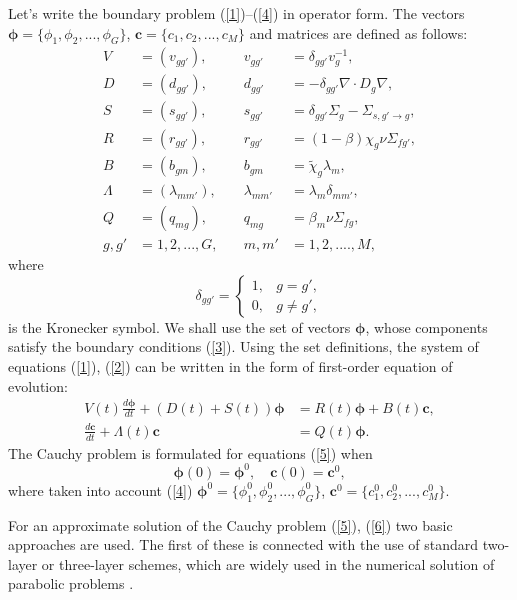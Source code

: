 \documentclass[authoryear]{elsarticle}
\begin{document}
Let's write the boundary problem (\ref{1})--(\ref{4}) in operator form. The vectors 
 $\bm \phi = \{\phi_1, \phi_2, ..., \phi_G\}$, $\bm c = \{c_1, c_2, ..., c_M\}$ 
and matrices are defined as follows:
\[
\begin{aligned}
 V & = (v_{g g'}), &
  \quad v_{g g'} & = \delta_{g g'} v_g^{-1}, \\
 D & = (d_{g g'}), &
 \quad d_{g g'} & = - \delta_{g g'} \nabla \cdot D_g \nabla, \\
 S & = (s_{g g'}), &
 \quad  s_{g g'} & =  \delta_{g g'} \Sigma_g - \Sigma_{s,g'\rightarrow g}, \\
 R & = (r_{g g'}), &
 \quad  r_{g g'} & = (1-\beta)\chi_g \nu \Sigma_{fg'}, \\
 B & = (b_{g m}), &
 \quad b_{g m} & = \widetilde{\chi}_g \lambda_m, \\
 \Lambda & = (\lambda_{m m'}), &
 \quad  \lambda_{m m'} & = \lambda_m \delta_{m m'}, \\
 Q & = (q_{mg}), &
 \quad  q_{mg} & = \beta_m \nu \Sigma_{fg}, \\
 g, g' & = 1,2, ..., G, &
 \quad m, m'  &= 1,2, ....,M,  
\end{aligned}
\]
where
\[
 \delta_{g g'} = \left \{ 
 \begin{matrix}
 1, & g = g', \\
 0, & g \neq  g',
 \end{matrix}
 \right . 
\] 
is the Kronecker symbol.
We shall use the set of vectors $\bm \phi$, whose components 
satisfy the boundary conditions (\ref{3}). 
Using the set definitions, the system of equations (\ref{1}), (\ref{2})  
can be written in the form of first-order equation of evolution:
\begin{equation}\label{5}
\begin{split}
V(t) \frac{d \bm \phi}{d t} + (D(t)+S(t)) \bm \phi &= R(t) \bm \phi + B(t)\bm c,
\\
\frac{d \bm c}{d t} + \Lambda(t)\bm c &= Q(t) \bm \phi. 
\end{split}
\end{equation}  
The Cauchy problem is formulated for equations (\ref{5})  when 
\begin{equation}\label{6}
 \bm \phi(0) = \bm \phi^0,
 \quad   \bm c(0) = \bm c^0,
\end{equation} 
where taken into account (\ref{4}) $\bm \phi^0 = \{ \phi_1^0,  \phi_2^0, ...,  \phi_G^0 \}$,  $\bm c^0 = \{c_1^0, c_2^0, ..., c_M^0\}$.

For an approximate solution of the Cauchy problem  (\ref{5}), (\ref{6}) 
two basic approaches are used. The first of these is connected with the use of standard two-layer or three-layer schemes, which are widely used in the numerical solution of parabolic problems  \citep{Samarskiibook}.
\end{document}
